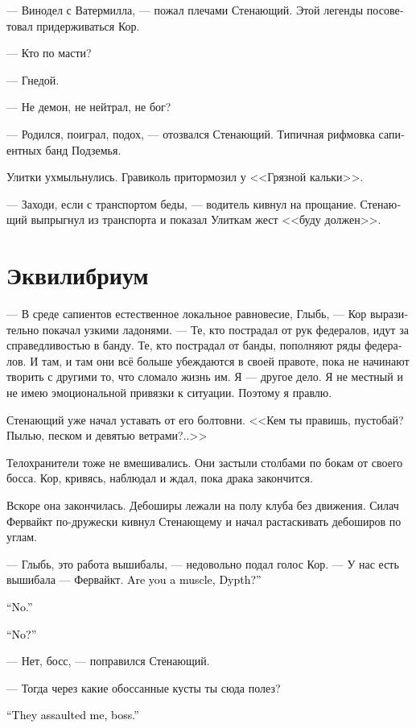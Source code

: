 \documentclass[a4paper,12pt,fleqn]{book}\usepackage{cooltooltips}\usepackage{polyglossia}\setdefaultlanguage[babelshorthands=true]{russian}\setotherlanguage{english}\defaultfontfeatures{Ligatures=TeX,Mapping=tex-text} \usepackage{xcolor}\definecolor{lightgray}{HTML}{bbbbbb}\color{lightgray}\newcommand{\ml}[3]{\textenglish{\textcolor{black}{#3}}}
\newcommand{\asterism}{\vspace{1em}{\centering\Large\bfseries$\ast~\ast~\ast$\par}\vspace{1em}}
\begin{document}
--- Винодел с Ватермилла, --- пожал плечами Стенающий.
Этой легенды посоветовал придерживаться Кор.

--- Кто по масти?

--- Гнедой.

--- Не демон, не нейтрал, не бог?

--- Родился, поиграл, подох, --- отозвался Стенающий.
Типичная рифмовка сапиентных банд Подземья.

Улитки ухмыльнулись.
Гравиколь притормозил у <<Грязной кальки>>.

--- Заходи, если с транспортом беды, --- водитель кивнул на прощание.
Стенающий выпрыгнул из транспорта и показал Улиткам жест <<буду должен>>.

\section{Эквилибриум}

--- В среде сапиентов естественное локальное равновесие, Глыбь, --- Кор выразительно покачал узкими ладонями.
--- Те, кто пострадал от рук федералов, идут за справедливостью в банду.
Те, кто пострадал от банды, пополняют ряды федералов.
И там, и там они всё больше убеждаются в своей правоте, пока не начинают творить с другими то, что сломало жизнь им.
Я --- другое дело.
Я не местный и не имею эмоциональной привязки к ситуации.
Поэтому я правлю.

Стенающий уже начал уставать от его болтовни.
<<Кем ты правишь, пустобай?
Пылью, песком и девятью ветрами?..>>

\asterism

Телохранители тоже не вмешивались.
Они застыли столбами по бокам от своего босса.
Кор, кривясь, наблюдал и ждал, пока драка закончится.

Вскоре она закончилась.
Дебоширы лежали на полу клуба без движения.
Силач Фервайкт по-дружески кивнул Стенающему и начал растаскивать дебоширов по углам.

--- Глыбь, это работа вышибалы, --- недовольно подал голос Кор.
--- У нас есть вышибала --- Фервайкт.
\ml{$0$}
{Ты вышибала, Глыбь?}
{Are you a muscle, Dypth?''}

\ml{$0$}
{--- Нет.}
{``No.''}

\ml{$0$}
{--- Нет?}
{``No?''}

--- Нет, босс, --- поправился Стенающий.

--- Тогда через какие обоссанные кусты ты сюда полез?

\ml{$0$}
{--- Они на меня напали, босс.}
{``They assaulted me, boss.''}
\end{document}
